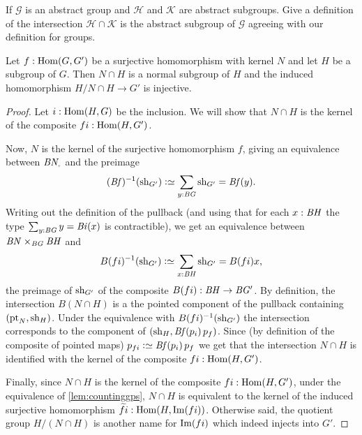 \begin{xca}
  If $\mathcal G$ is an abstract group and $\mathcal H$ and $\mathcal K$ are abstract subgroups.  Give a definition of the intersection $\mathcal H\cap\mathcal K$ is the abstract subgroup of $\mathcal G$ agreeing with our definition for groups.
\end{xca}
\begin{lemma}
  \label{lem:whatSylow2needs}
  Let $f:\Hom(G,G')$ be a surjective homomorphism with kernel $N$ and let $H$ be a subgroup of $G$.  Then
$N\cap H$ is a normal subgroup of $H$
and the induced homomorphism $H/N\cap H\to G'$ is injective.
  \begin{proof}
Let $i:\Hom(H,G)$ be the inclusion.  We will show that $N\cap H$ is the kernel of the composite $fi:\Hom(H,G')$.  

Now, $N$ is the kernel of the surjective homomorphism $f$, giving an equivalence between $\BN_\div$ and the preimage 
$$(\Bf)^{-1}(\sh_{G'})\defequi\sum_{y:\BG}\sh_{G'}=\Bf(y).$$  
Writing out the definition of the pullback (and using that for each $x:\mathit{B}\mathit{H}$ the type $\sum_{y:\mathit{B}\mathit{G}}y=\mathit{B}\mathit{i}(x)$ is contractible), we get an equivalence between $\mathit{B}\mathit{N}\times_{\mathit{B}\mathit{G}}\mathit{B}\mathit{H}$ and 
$$B(fi)^{-1}(\sh_{G'})\defequi\sum_{x:\BH}\sh_{G'}=B(fi)x,$$  
the preimage of $\mathrm{sh}_{G'}$ of the composite $B(fi):\mathit{B}\mathit{H}\to \mathit{B}\mathit{G}'$.
 By definition, the intersection $B(N\cap H)$ is a the pointed component of the pullback containing $(\mathrm{pt}_N,\mathrm{sh}_H)$.  Under the equivalence with $B(fi)^{-1}(\mathrm{sh}_{G'})$ the intersection corresponds to the component of $(\sh_H,\Bf(p_i)\,p_f)%
 $.  
Since (by definition of the composite of pointed maps) $p_{fi}\defequi \Bf(p_i)\,p_f$ we get that the intersection $N\cap H$ is identified with the kernel of the composite $fi:\Hom(H,G')$.

Finally, since $N\cap H$ is the kernel of the composite $fi:\Hom(H,G')$, under the equivalence of \cref{lem:countinggps}, $N\cap H$ is equivalent to the kernel of the induced surjective homomorphism $\widetilde {fi}:\Hom(H,\image (fi))$.  Otherwise said, the quotient group $H/(N\cap H)$ is another name for $\image (fi)$ which indeed injects into $G'$.
  \end{proof}
\end{lemma}



